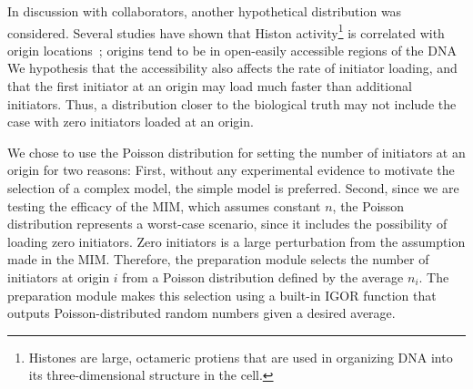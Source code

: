 		In discussion with collaborators, another hypothetical distribution was considered.
		Several studies have shown that Histon activity\footnote{
		Histones are large, octameric protiens that are used in organizing DNA into its three-dimensional structure in the cell.}
		is correlated with origin locations~\cite{Histone,Histone2,Histone3}; origins tend to be in open-easily accessible regions of the DNA
		We hypothesis that the accessibility also affects the rate of initiator loading, and that the first initiator at an origin may load much faster than additional initiators.
		Thus, a distribution closer to the biological truth may not include the case with zero initiators loaded at an origin.
		
		We chose to use the Poisson distribution for setting the number of initiators at an origin for two reasons:
		First, without any experimental evidence to motivate the selection of a complex model, the simple model is preferred.
		Second, since we are testing the efficacy of the MIM, which assumes constant $n$, the Poisson distribution represents a worst-case scenario, since it includes the possibility of loading zero initiators.
		Zero initiators is a large perturbation from the assumption made in the MIM.
		Therefore, the preparation module selects the number of initiators at origin $i$ from a Poisson distribution defined by the average $n_i$.
		The preparation module makes this selection using a built-in IGOR function that outputs Poisson-distributed random numbers given a desired average.
		
